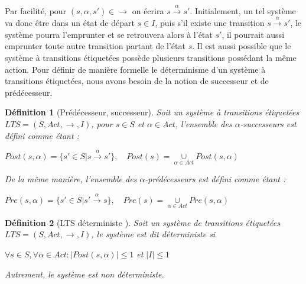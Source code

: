 \documentclass[12pt,a4paper,oneside]{book}
\theoremstyle{break}
\newtheorem{defin}{Définition}[chapter]
\theoremstyle{breakplain}
\begin{document}
Par facilité, pour $(s, \alpha, s') \in \rightarrow$ on écrira $s\xrightarrow{\alpha}{}s'$. Initialement, un tel système va donc être dans un état de départ $s\in I$, puis s'il existe une transition $s\xrightarrow{\alpha}{}s'$, le système pourra l'emprunter et se retrouvera alors à l'état $s'$, il pourrait aussi emprunter toute autre transition partant de l'état $s$. Il est aussi possible que le système à transitions étiquetées possède plusieurs transitions possédant la même action. Pour définir de manière formelle le déterminisme d'un système à transitions étiquetées, nous avons besoin de la notion de successeur et de prédécesseur.


\begin{defin}[Prédécesseur, successeur\cite{baier2008principles}]
Soit un système à transitions étiquetées $LTS = (S, Act, \rightarrow, I)$, pour $s \in S$ et $\alpha \in Act$, l'ensemble des $\alpha$-successeurs est défini comme étant :
\begin{center}
$Post(s,\alpha) = \{ s' \in S | s\xrightarrow{\alpha}{}s' \}, \quad Post(s) = \underset{\alpha \in Act}{\cup} Post(s, \alpha)$
\end{center}
De la même manière, l'ensemble des $\alpha$-prédécesseurs est défini comme étant :
\begin{center}
$Pre(s,\alpha) = \{ s' \in S | s'\xrightarrow{\alpha}{}s \}, \quad Pre(s) = \underset{\alpha \in Act}{\cup} Pre(s, \alpha)$
\end{center}
\end{defin}

\begin{defin}[LTS déterministe \cite{baier2008principles}]
Soit un système de transitions étiquetées $LTS = (S, Act, \rightarrow, I)$, le système est dit déterministe si 
\begin{center}
$\forall s \in S, \forall \alpha \in Act : |Post(s,\alpha)| \leq 1$ et $|I| \leq 1$
\end{center}
Autrement, le système est non déterministe.
\end{defin}

\end{document}
